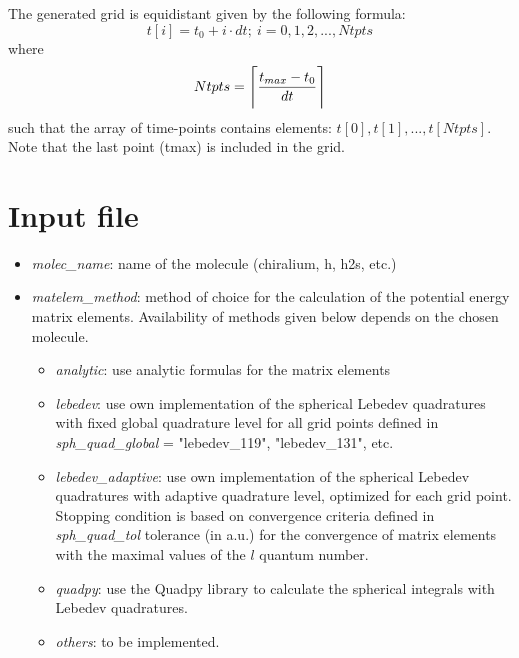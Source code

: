 \documentclass[a4paper,american,floatfix,pdftex,superscriptaddress,twoside,%
aps,pra,
linenumbers,%
reprint,%
]{revtex4-2}%
\DeclarePairedDelimiter{\ceil}{\lceil}{\rceil}
\begin{document}
The generated grid is equidistant given by the following formula:
\begin{equation}
t[i] = t_0 + i \cdot dt ;\ i=0,1,2,...,Ntpts
\end{equation}
where 
\begin{equation}
Ntpts = \ceil[\Bigg]{\frac{t_{max}-t_0}{dt}}
\end{equation}
such that the array of time-points contains elements: $t[0],t[1],...,t[Ntpts]$.
Note that the last point (tmax) is included in the grid. 

\section{Input file}


\begin{itemize}
	\item \textit{molec\_name}: name of the molecule (chiralium, h, h2s, etc.)
	\item \textit{matelem\_method}: method of choice for the calculation of the potential energy matrix elements. Availability of methods given below depends on the chosen molecule.
	\begin{itemize}
		\item \textit{analytic}: use analytic formulas for the matrix elements
		\item \textit{lebedev}: use own implementation of the spherical Lebedev quadratures with fixed global quadrature level for all grid points defined in \textit{sph\_quad\_global} = "lebedev\_119", "lebedev\_131", etc.
		\item \textit{lebedev\_adaptive}: use own implementation of the spherical Lebedev quadratures with adaptive quadrature level, optimized for each grid point. Stopping condition is based on convergence criteria defined in \textit{sph\_quad\_tol} tolerance (in a.u.) for the convergence of matrix elements with the maximal values of the $l$ quantum number. 
		\item \textit{quadpy}: use the Quadpy library to calculate the spherical integrals with Lebedev quadratures.
		\item \textit{others}: to be implemented.
	\end{itemize}

\end{itemize}

\end{document}
